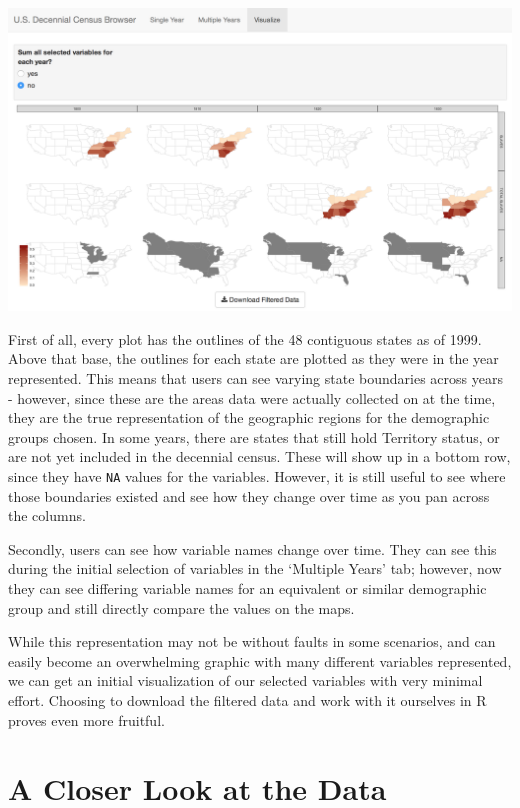 \documentclass[DIV=calc, paper=a4, fontsize=10pt, twocolumn]{scrartcl}\usepackage[]{graphicx}\usepackage[]{color}
\begin{document}
\begin{center}
\includegraphics[width=.48\textwidth]{./figures/visualize_slaves_40years.png}  
\label{shiny_2}
\end{center}

\par First of all, every plot has the outlines of the 48 contiguous states as of 1999. Above that base, the outlines for each state are plotted as they were in the year represented. This means that users can see varying state boundaries across years - however, since these are the areas data were actually collected on at the time, they are the true representation of the geographic regions for the demographic groups chosen. In some years, there are states that still hold Territory status, or are not yet included in the decennial census. These will show up in a bottom row, since they have \texttt{NA} values for the variables. However, it is still useful to see where those boundaries existed and see how they change over time as you pan across the columns.

\par Secondly, users can see how variable names change over time. They can see this during the initial selection of variables in the `Multiple Years' tab; however, now they can see differing variable names for an equivalent or similar demographic group and still directly compare the values on the maps. 

\par While this representation may not be without faults in some scenarios, and can easily become an overwhelming graphic with many different variables represented, we can get an initial visualization of our selected variables with very minimal effort. Choosing to download the filtered data and work with it ourselves in R proves even more fruitful. 

\section*{A Closer Look at the Data}
\end{document}
